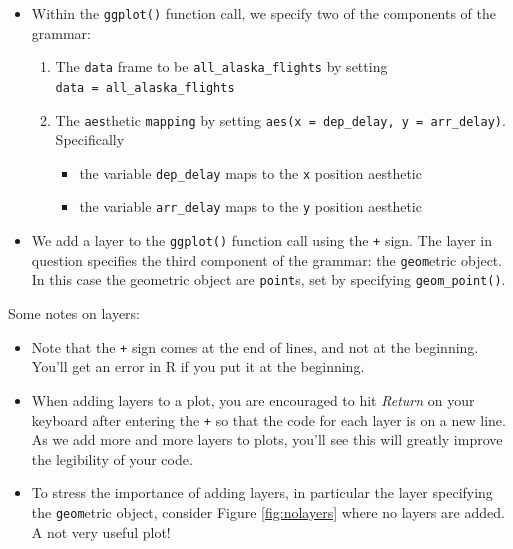 \documentclass[12pt,]{krantz}
\providecommand{\tightlist}{%
  \setlength{\itemsep}{0pt}\setlength{\parskip}{0pt}}
\begin{document}
\begin{itemize}
\tightlist
\item
  Within the \texttt{ggplot()} function call, we specify two of the
  components of the grammar:

  \begin{enumerate}
  \def\labelenumi{\arabic{enumi}.}
  \tightlist
  \item
    The \texttt{data} frame to be \texttt{all\_alaska\_flights} by
    setting \texttt{data\ =\ all\_alaska\_flights}
  \item
    The \texttt{aes}thetic \texttt{mapping} by setting
    \texttt{aes(x\ =\ dep\_delay,\ y\ =\ arr\_delay)}. Specifically

    \begin{itemize}
    \tightlist
    \item
      the variable \texttt{dep\_delay} maps to the \texttt{x} position
      aesthetic
    \item
      the variable \texttt{arr\_delay} maps to the \texttt{y} position
      aesthetic
    \end{itemize}
  \end{enumerate}
\item
  We add a layer to the \texttt{ggplot()} function call using the
  \texttt{+} sign. The layer in question specifies the third component
  of the grammar: the \texttt{geom}etric object. In this case the
  geometric object are \texttt{point}s, set by specifying
  \texttt{geom\_point()}.
\end{itemize}

Some notes on layers:

\begin{itemize}
\tightlist
\item
  Note that the \texttt{+} sign comes at the end of lines, and not at
  the beginning. You'll get an error in R if you put it at the
  beginning.
\item
  When adding layers to a plot, you are encouraged to hit \emph{Return}
  on your keyboard after entering the \texttt{+} so that the code for
  each layer is on a new line. As we add more and more layers to plots,
  you'll see this will greatly improve the legibility of your code.
\item
  To stress the importance of adding layers, in particular the layer
  specifying the \texttt{geom}etric object, consider Figure
  \ref{fig:nolayers} where no layers are added. A not very useful plot!
\end{itemize}
\end{document}
